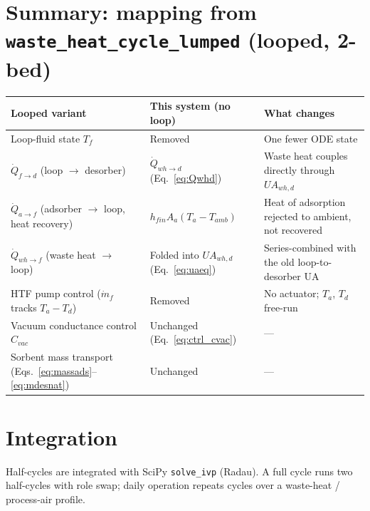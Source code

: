 \documentclass[11pt]{article}
\begin{document}
\section*{Summary: mapping from \texttt{waste\_heat\_cycle\_lumped} (looped, 2-bed)}

\begin{table}[h]
\centering
\small
\begin{tabular}{@{}p{}p{}p{}@{}}
\toprule
\textbf{Looped variant} & \textbf{This system (no loop)} & \textbf{What changes} \\
\midrule
Loop-fluid state $T_f$ & Removed & One fewer ODE state \\
$\dot{Q}_{f\to d}$ (loop $\to$ desorber) & $\dot{Q}_{wh\to d}$ (Eq.~\eqref{eq:Qwhd}) & Waste heat couples directly through $UA_{wh,d}$ \\
$\dot{Q}_{a\to f}$ (adsorber $\to$ loop, heat recovery) & $h_{fin}A_a(T_a - T_{amb})$ & Heat of adsorption rejected to ambient, not recovered \\
$\dot{Q}_{wh\to f}$ (waste heat $\to$ loop) & Folded into $UA_{wh,d}$ (Eq.~\eqref{eq:uaeq}) & Series-combined with the old loop-to-desorber UA \\
HTF pump control ($\dot{m}_f$ tracks $T_a - T_d$) & Removed & No actuator; $T_a$, $T_d$ free-run \\
Vacuum conductance control $C_{vac}$ & Unchanged (Eq.~\eqref{eq:ctrl_cvac}) & --- \\
Sorbent mass transport (Eqs.~\eqref{eq:massads}--\eqref{eq:mdesnat}) & Unchanged & --- \\
\bottomrule
\end{tabular}
\end{table}

\section*{Integration}

Half-cycles are integrated with SciPy \texttt{solve\_ivp} (Radau). A full cycle runs two half-cycles with role swap; daily operation repeats cycles over a waste-heat / process-air profile.
\end{document}
